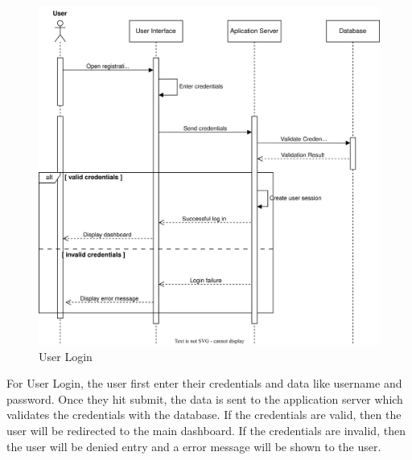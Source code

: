 \documentclass[a4paper,12pt, oneside]{report}
\begin{document}
\begin{figure}[H]
    \centering
    \includegraphics[width=\linewidth]{UMLDiagrams/userLogin_white.jpg}
    \caption{User Login}
    \label{fig:user-login}
\end{figure}
For User Login, the user first enter their credentials and data like username and password. Once they hit submit, the data is sent to the application server which validates the credentials with the database. If the credentials are valid, then the user will be redirected to the main dashboard. If the credentials are invalid, then the user will be denied entry and a error message will be shown to the user.
\end{document}
